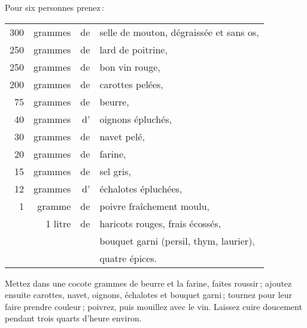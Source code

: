 Pour six personnes prenez :

\footnotesize
\begin{longtable}{rrrp{16em}}
    300 & grammes & de & selle de mouton, dégraissée et sans os,                                          \\
    250 & grammes & de & lard de poitrine,                                                                \\
    250 & grammes & de & bon vin rouge,                                                                   \\
    200 & grammes & de & carottes pelées,                                                                 \\
     75 & grammes & de & beurre,                                                                          \\
     40 & grammes & d' & oignons épluchés,                                                                \\
     30 & grammes & de & navet pelé,                                                                      \\
     20 & grammes & de & farine,                                                                          \\
     15 & grammes & de & sel gris,                                                                        \\
     12 & grammes & d' & échalotes épluchées,                                                             \\
      1 & gramme  & de & poivre fraîchement moulu,                                                        \\
        & 1 litre & de & haricots rouges, frais écossés,                                                  \\
        &         &    & bouquet garni (persil, thym, laurier),                                           \\
        &         &    & quatre épices.                                                                   \\
\end{longtable}
\normalsize

Mettez dans une cocote {\mmm} grammes de beurre et la farine, faites
roussir ; ajoutez ensuite carottes, navet, oignons, échalotes et bouquet
garni ; tournez pour leur faire prendre couleur ; poivrez, puis mouillez avec
le vin. Laissez cuire doucement pendant trois quarts d'heure environ.

